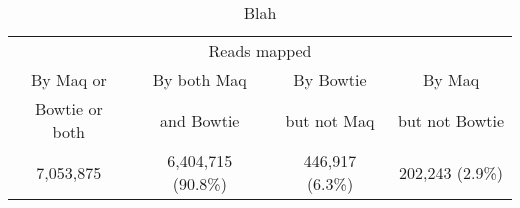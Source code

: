 \documentclass[letterpaper]{article}
\begin{document}
\begin{table}[tp]
\scriptsize
\begin{tabular}{cccc}
\multicolumn{4}{c}{Reads mapped} \\[3pt] 
By Maq or      & By both Maq & By Bowtie   & By Maq         \\ 
Bowtie or both & and Bowtie  & but not Maq & but not Bowtie \\ 
\toprule
7,053,875 & 6,404,715 (90.8\%) & 446,917 (6.3\%) & 202,243 (2.9\%) \\ 
\bottomrule
\end{tabular}
\caption{Blah}
\end{table}
\end{document}
